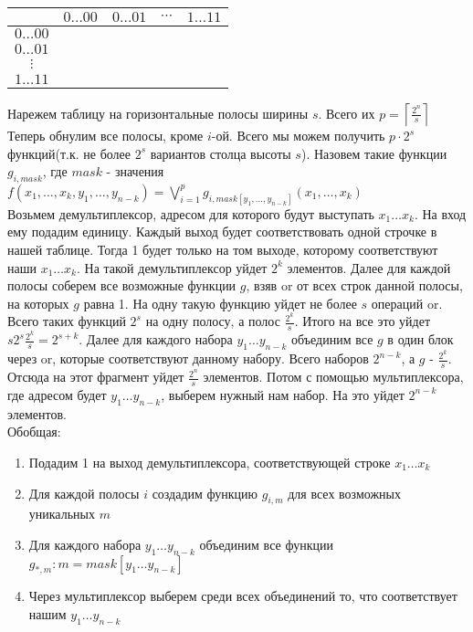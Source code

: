 \documentclass[12pt]{article}
\begin{document}
\begin{center}
    \begin{tabular}{c|cccc}
        & $0\ldots00$ & $0\ldots01$ & $\cdots$ & $1\ldots11$\\
        \hline
        $0\ldots00$ & & & & \\
        $0\ldots01$ & & & & \\
        $\vdots$ & & & & \\
        $1\ldots11$ & & & &
    \end{tabular}
\end{center}
Нарежем таблицу на горизонтальные полосы ширины $s$. Всего их $p=\left\lceil \frac {2^n}s \right\rceil$\\
Теперь обнулим все полосы, кроме $i$-ой. Всего мы можем получить $p\cdot 2^s$ функций(т.к. не более $2^s$ вариантов столца высоты $s$). Назовем такие функции $g_{i,mask}$, где $mask$ - значения\\
$f(x_1,\ldots,x_k,y_1,\ldots,y_{n-k})=\bigvee_{i=1}^p g_{i,mask[y_1,\ldots,y_{n-k}]}(x_1,\ldots,x_k)$\\
Возьмем демультиплексор, адресом для которого будут выступать $x_1\ldots x_k$. На вход ему подадим единицу. Каждый выход будет соответствовать одной строчке в нашей таблице. Тогда 1 будет только на том выходе, которому соответствуют наши $x_1\ldots x_k$. На такой демультиплексор уйдет $2^k$ элементов. Далее для каждой полосы соберем все возможные функции $g$, взяв or от всех строк данной полосы, на которых $g$ равна 1. На одну такую функцию уйдет не более $s$ операций or. Всего таких функций $2^s$ на одну полосу, а полос $\frac{2^k}s$. Итого на все это уйдет $s2^s\frac{2^k}s = 2^{s+k}$. Далее для каждого набора $y_1\ldots y_{n-k}$ объединим все $g$ в один блок через or, которые соответствуют данному набору. Всего наборов $2^{n-k}$, а $g$ - $\frac{2^k}s$. Отсюда на этот фрагмент уйдет $\frac{2^n}s$ элементов. Потом с помощью мультиплексора, где адресом будет $y_1\ldots y_{n-k}$, выберем нужный нам набор. На это уйдет $2^{n-k}$ элементов.\\
Обобщая:
\begin{enumerate}
    \item Подадим 1 на выход демультиплексора, соответствующей строке $x_1\ldots x_k$
    \item Для каждой полосы $i$ создадим функцию $g_{i,m}$ для всех возможных уникальных $m$
    \item Для каждого набора $y_1\ldots y_{n-k}$ объединим все функции $g_{*,m}: m = mask[y_1\ldots y_{n-k}]$
    \item Через мультиплексор выберем среди всех объединений то, что соответствует нашим $y_1\ldots y_{n-k}$
\end{enumerate}
\end{document}
